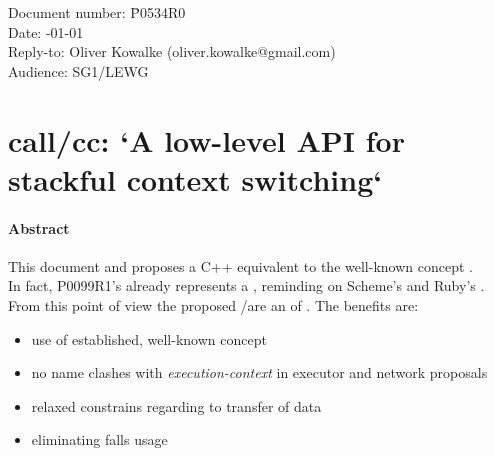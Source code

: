 \documentclass[paper=A4,pagesize,DIV=15]{scrartcl}
\begin{document}
\small
\begin{tabbing}
    Document number: \= P0534R0\\
    Date:            -01-01\\
    Reply-to:        \> Oliver Kowalke (oliver.kowalke@gmail.com)\\
    Audience:        \> SG1/LEWG\\
\end{tabbing}

\section*{call/cc: `A low-level API for stackful context switching`}


\tableofcontents


\paragraph*{Abstract}
This document  and proposes a C++
equivalent to the well-known concept \callcc.\\
In fact, P0099R1's \ectx already represents a ,
reminding on Scheme's\cite{schemecallcc} and Ruby's\cite{rubycallcc} \cc.
From this point of view the proposed \call/\cont are an  of
\ectx. The benefits are:
\begin{itemize}
    \item   use of established, well-known concept
    \item   no name clashes with \emph{execution-context} in
            executor and network proposals
    \item   relaxed constrains regarding to transfer of data
    \item   eliminating falls usage
\end{itemize}





%
%
%
%




\end{document}
